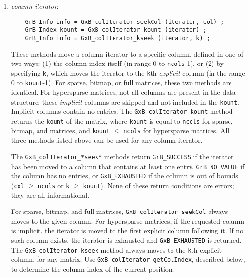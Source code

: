 \documentclass[12pt]{article}
\begin{document}
\begin{enumerate}
    \item {\em column iterator}:
    {\footnotesize
    \begin{verbatim}
    GrB_Info info = GxB_colIterator_seekCol (iterator, col) ;
    GrB_Index kount = GxB_colIterator_kount (iterator) ;
    GrB_Info info = GxB_colIterator_kseek (iterator, k) ; \end{verbatim}}

        These methods move a column iterator to a specific column, defined in
        one of two ways: (1) the column index itself (in range 0 to
        \verb'ncols'-1), or (2) by specifying \verb'k', which moves the
        iterator to the \verb'k'th {\em explicit} column (in the range 0 to
        \verb'kount'-1). For sparse, bitmap, or full matrices, these two
        methods are identical.  For hypersparse matrices, not all columns are
        present in the data structure; these {\em implicit} columns are skipped
        and not included in the \verb'kount'.  Implicit columns contain no
        entries.  The \verb'GxB_colIterator_kount' method returns the
        \verb'kount' of the matrix, where \verb'kount' is equal to \verb'ncols'
        for sparse, bitmap, and matrices, and \verb'kount' $\le$ \verb'ncols'
        for hypersparse matrices.  All three methods listed above can be used
        for any column iterator.

        The \verb'GxB_colIterator_*seek*' methods return \verb'GrB_SUCCESS' if
        the iterator has been moved to a column that contains at least one
        entry, \verb'GrB_NO_VALUE' if the column has no entries, or
        \verb'GxB_EXHAUSTED' if the column is out of bounds (\verb'col' $\ge$
        \verb'ncols' or \verb'k' $\ge$ \verb'kount').
        None of these return conditions are
        errors; they are all informational.

        For sparse, bitmap, and full matrices, \verb'GxB_colIterator_seekCol'
        always moves to the given column.  For hypersparse matrices, if the
        requested column is implicit, the iterator is moved to the first
        explicit column following it.  If no such column exists, the iterator
        is exhausted and \verb'GxB_EXHAUSTED' is returned.
        The \verb'GxB_colIterator_kseek' method always moves to the \verb'k'th
        explicit column, for any matrix.
        Use \newline
        \verb'GxB_colIterator_getColIndex', described below, to determine
        the column index of the current position.


\end{enumerate}
\end{document}
